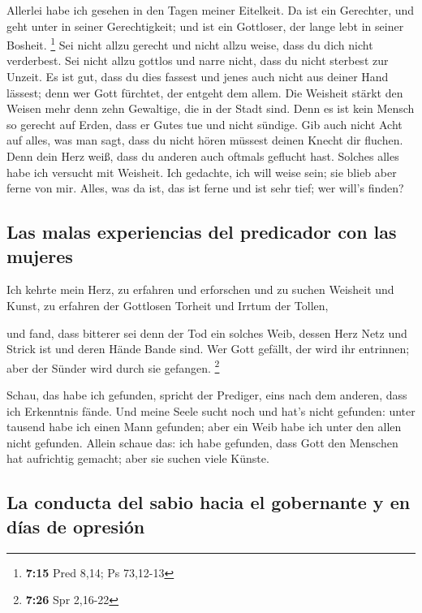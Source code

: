  Allerlei habe ich gesehen in den Tagen meiner Eitelkeit.
Da ist ein Gerechter, und geht unter in seiner Gerechtigkeit; und ist
ein Gottloser, der lange lebt in seiner Bosheit. \footnote{\textbf{7:15}
  Pred 8,14; Ps 73,12-13}  Sei nicht allzu gerecht und
nicht allzu weise, dass du dich nicht verderbest.  Sei
nicht allzu gottlos und narre nicht, dass du nicht sterbest zur Unzeit.
 Es ist gut, dass du dies fassest und jenes auch nicht
aus deiner Hand lässest; denn wer Gott fürchtet, der entgeht dem allem.
 Die Weisheit stärkt den Weisen mehr denn zehn Gewaltige,
die in der Stadt sind.  Denn es ist kein Mensch so
gerecht auf Erden, dass er Gutes tue und nicht sündige. 
Gib auch nicht Acht auf alles, was man sagt, dass du nicht hören müssest
deinen Knecht dir fluchen.  Denn dein Herz weiß, dass du
anderen auch oftmals geflucht hast.  Solches alles habe
ich versucht mit Weisheit. Ich gedachte, ich will weise sein; sie blieb
aber ferne von mir.  Alles, was da ist, das ist ferne und
ist sehr tief; wer will's finden?

\hypertarget{las-malas-experiencias-del-predicador-con-las-mujeres}{%
\subsection{Las malas experiencias del predicador con las
mujeres}\label{las-malas-experiencias-del-predicador-con-las-mujeres}}

 Ich kehrte mein Herz, zu erfahren und erforschen und zu
suchen Weisheit und Kunst, zu erfahren der Gottlosen Torheit und Irrtum
der Tollen,

 und fand, dass bitterer sei denn der Tod ein solches
Weib, dessen Herz Netz und Strick ist und deren Hände Bande sind. Wer
Gott gefällt, der wird ihr entrinnen; aber der Sünder wird durch sie
gefangen. \footnote{\textbf{7:26} Spr 2,16-22}

 Schau, das habe ich gefunden, spricht der Prediger, eins
nach dem anderen, dass ich Erkenntnis fände.  Und meine
Seele sucht noch und hat's nicht gefunden: unter tausend habe ich einen
Mann gefunden; aber ein Weib habe ich unter den allen nicht gefunden.
 Allein schaue das: ich habe gefunden, dass Gott den
Menschen hat aufrichtig gemacht; aber sie suchen viele Künste.

\hypertarget{la-conducta-del-sabio-hacia-el-gobernante-y-en-duxedas-de-opresiuxf3n}{%
\subsection{La conducta del sabio hacia el gobernante y en días de
opresión}\label{la-conducta-del-sabio-hacia-el-gobernante-y-en-duxedas-de-opresiuxf3n}}

